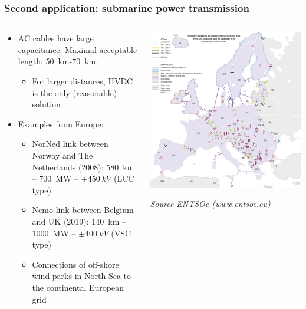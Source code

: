 \begin{frame}
\frametitle{Second application: submarine power transmission}
\begin{columns}
\begin{column}{0.6\linewidth}
\begin{itemize}
    \item AC cables have large capacitance. Maximal acceptable length: \SI{50}{km}-\SI{70}{km}.
    \begin{itemize}
        \item For larger distances, HVDC is the only (reasonable) solution
    \end{itemize}
    \item Examples from Europe:
    \begin{itemize}
        \item NorNed link between Norway and The Netherlands (2008): \SI{580}{km} -- \SI{700}{MW} -- $\pm \SI{450}{kV}$ (LCC type)
        \item Nemo link between Belgium and UK (2019): \SI{140}{km} -- \SI{1000}{MW} -- $\pm \SI{400}{kV}$ (VSC type)
        \item Connections of off-shore wind parks in North Sea to the continental European grid
    \end{itemize}
\end{itemize}
\end{column}
\begin{column}{0.4\linewidth}
\begin{center}
    \includegraphics[width=0.8\linewidth]{images/entsoe.jpg}
\end{center}
\begin{center}
    \textit{Source ENTSOe (www.entsoe.eu)}
\end{center}
\end{column}
\end{columns}
\end{frame}



